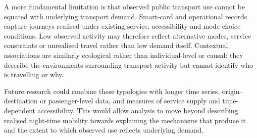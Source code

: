 A more fundamental limitation is that observed public transport use cannot be equated with underlying transport demand. Smart-card and operational records capture journeys realised under existing service, accessibility and mode-choice conditions. Low observed activity may therefore reflect alternative modes, service constraints or unrealised travel rather than low demand itself. Contextual associations are similarly ecological rather than individual-level or causal: they describe the environments surrounding transport activity but cannot identify who is travelling or why.

Future research could combine these typologies with longer time series, origin--destination or passenger-level data, and measures of service supply and time-dependent accessibility. This would allow analysis to move beyond describing realised night-time mobility towards explaining the mechanisms that produce it and the extent to which observed use reflects underlying demand.

